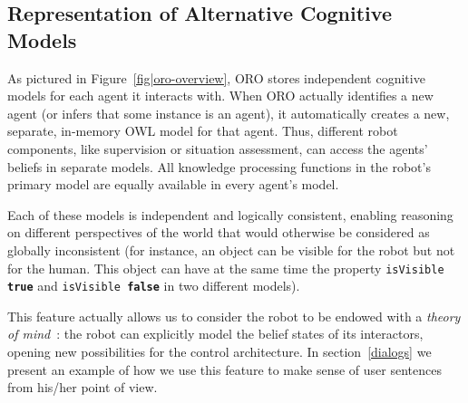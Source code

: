 \documentclass{svmult}
\newcommand{\concept}[1]{{\footnotesize \texttt{#1}}}
\newcommand{\eg}{{\textit{e.g.~}}}
\begin{document}
\subsection{Representation of Alternative Cognitive Models}
\label{alterite}

As pictured in Figure~\ref{fig|oro-overview}, ORO stores independent cognitive
models for each agent it interacts with. When ORO actually identifies a new
agent (or infers that some instance is an agent), it automatically creates a
new, separate, in-memory OWL model for that agent. Thus, different robot
components, like supervision or situation assessment, can access the
agents' beliefs in separate models. All knowledge processing functions in the
robot's primary model are equally available in every agent's model.

Each of these models is independent and logically consistent,
enabling reasoning on different perspectives of the world that would otherwise
be considered as globally inconsistent (for instance, an object can be visible for the
robot but not for the human. This object can have at the same time the property
\concept{isVisible \textbf{true}} and \concept{isVisible \textbf{false}} in
two different models). 

This feature actually allows us to consider the robot to be endowed with a
\emph{theory of mind}~\cite{Scassellati2002}: the robot can explicitly model
the belief states of its interactors, opening new possibilities for the control
architecture. In section~\ref{dialogs} we present an example of how we use this feature to
make sense of user sentences from his/her point of view.

% 
% 
\end{document}
